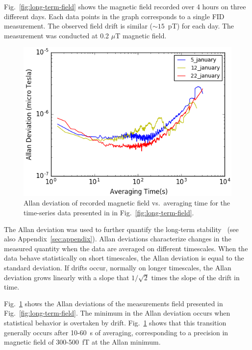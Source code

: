Fig.~\ref{fig:long-term-field} shows the magnetic field recorded over
4 hours on three different days. Each data points in the graph
corresponds to a single FID measurement.  The observed field drift is
similar ($\sim 15$~pT) for each day.  The measurement was conducted at
0.2 $\mu$T magnetic field.

\begin{figure}%
\centering\includegraphics[width=0.8\linewidth]{figures/field_3_day_allan.png}
\caption{Allan deviation of recorded magnetic field vs.~averaging time
  for the time-series data presented in in
  Fig.~\ref{fig:long-term-field}.\label{fig:allan_deviation}}
\end{figure}

The Allan deviation was used to further quantify the long-term
stability~\cite{doe:website2} (see also Appendix~\ref{sec:appendix}).
Allan deviations characterize changes in the measured quantity when
the data are averaged on different timescales.  When the data behave
statistically on short timescales, the Allan deviation is equal to the
standard deviation.  If drifts occur, normally on longer timescales,
the Allan deviation grows linearly with a slope that $1/\sqrt{2}$
times the slope of the drift in time.

Fig.~\ref{fig:allan_deviation} shows the Allan deviations of the
measurements field presented in Fig.~\ref{fig:long-term-field}.  The
minimum in the Allan deviation occurs when statistical behavior is
overtaken by drift.  Fig.~\ref{fig:allan_deviation} shows that this
transition generally occurs after 10-60~s of averaging, corresponding
to a precision in magnetic field of 300-500~fT at the Allan minimum.

